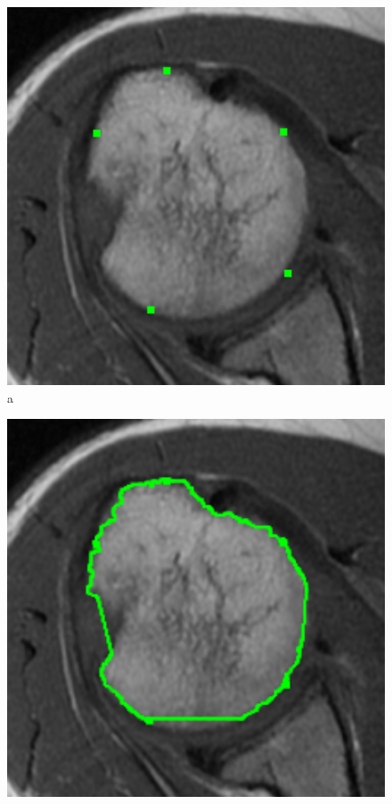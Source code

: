 \documentclass[a4paper,11pt,twoside,openright]{report}
\theoremstyle{definition}
\begin{document}
\begin{figure}[h!]
\begin{center}
	\begin{center}
		\includegraphics[width=1.0\textwidth]{146}
		a
	\end{center}
	\endminipage\hfill
	\begin{center}
		\includegraphics[width=1.0\textwidth]{147}

\end{center}
\end{center}
\end{figure}
\end{document}
